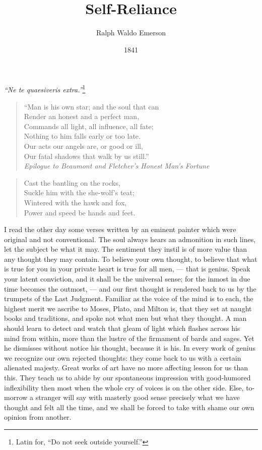 \documentclass[12pt]{article}
\title{Self-Reliance}
\author{Ralph Waldo Emerson}
\date{1841}
\begin{document}
\pagestyle{fancy}
\maketitle

{\it ``Ne te quaesiveris extra.''}\footnote{Latin for, ``Do not seek outside yourself.''}

\begin{verse}
``Man is his own star; and the soul that can\\
Render an honest and a perfect man,\\
Commands all light, all influence, all fate;\\
Nothing to him falls early or too late.\\
Our acts our angels are, or good or ill,\\
Our fatal shadows that walk by us still.''\\

{\it Epilogue to Beaumont and Fletcher's Honest Man's Fortune}
\end{verse}

\begin{verse}
Cast the bantling on the rocks,\\
Suckle him with the she-wolf's teat;\\
Wintered with the hawk and fox,\\
Power and speed be hands and feet.
\end{verse}

I read the other day some verses written by an eminent painter which were
original and not conventional. The soul always hears an admonition in such
lines, let the subject be what it may. The sentiment they instil is of more
value than any thought they may contain. To believe your own thought, to
believe that what is true for you in your private heart is true for all
men, --- that is genius. Speak your latent conviction, and it shall be the
universal sense; for the inmost in due time becomes the outmost, --- and our
first thought is rendered back to us by the trumpets of the Last Judgment.
Familiar as the voice of the mind is to each, the highest merit we ascribe
to Moses, Plato, and Milton is, that they set at naught books and
traditions, and spoke not what men but what they thought. A man should learn
to detect and watch that gleam of light which flashes across his mind from
within, more than the lustre of the firmament of bards and sages. Yet he
dismisses without notice his thought, because it is his. In every work of
genius we recognize our own rejected thoughts: they come back to us with a
certain alienated majesty. Great works of art have no more affecting lesson
for us than this. They teach us to abide by our spontaneous impression with
good-humored inflexibility then most when the whole cry of voices is on the
other side. Else, to-morrow a stranger will say with masterly good sense
precisely what we have thought and felt all the time, and we shall be forced
to take with shame our own opinion from another.
\end{document}

